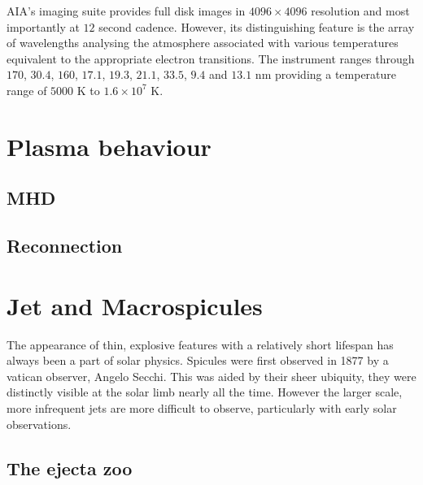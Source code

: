 AIA's imaging suite provides full disk images in $4096 \times 4096$ resolution and most importantly at $12$ second cadence.
However, its distinguishing feature is the array of wavelengths analysing the atmosphere \cite{AIAspec} associated with various temperatures equivalent to the appropriate electron transitions.
The instrument ranges through $170$, $30.4$, $160$, $17.1$, $19.3$, $21.1$, $33.5$, $9.4$ and $13.1$ nm providing a temperature range of $5000$ K to $1.6 \times 10^7$ K.




\section{Plasma behaviour}

\subsection{MHD}

\subsection{Reconnection}

\section{Jet and Macrospicules}

The appearance of thin, explosive features with a relatively short lifespan has always been a part of solar physics.
Spicules were first observed in 1877 by a vatican observer, Angelo Secchi.
This was aided by their sheer ubiquity, they were distinctly visible at the solar limb nearly all the time.
However the larger scale, more infrequent jets are more difficult to observe, particularly with early solar observations.

\subsection{The ejecta zoo}

